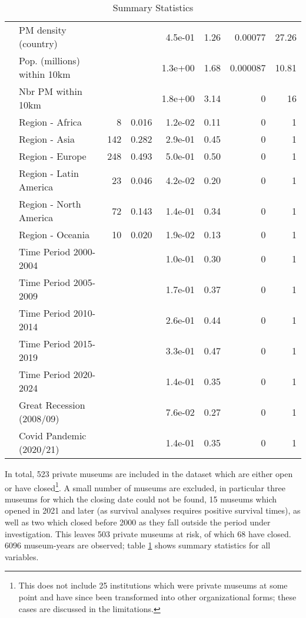 \documentclass[12pt]{article}
\begin{document}
\begin{table}[ht]
\begin{tabular}{llrrrrrr}
 & PM density (country) &  &  & 4.5e-01 &  1.26 & 0.00077 & 27.26 \\ 
   & Pop. (millions) within 10km &  &  & 1.3e+00 &  1.68 & 0.000087 & 10.81 \\ 
   & Nbr PM within 10km &  &  & 1.8e+00 &  3.14 & 0 & 16 \\ 
   & Region - Africa & 8 & 0.016 & 1.2e-02 &  0.11 & 0 & 1 \\ 
   & Region - Asia & 142 & 0.282 & 2.9e-01 &  0.45 & 0 & 1 \\ 
   & Region - Europe & 248 & 0.493 & 5.0e-01 &  0.50 & 0 & 1 \\ 
   & Region - Latin America & 23 & 0.046 & 4.2e-02 &  0.20 & 0 & 1 \\ 
   & Region - North America & 72 & 0.143 & 1.4e-01 &  0.34 & 0 & 1 \\ 
   & Region - Oceania & 10 & 0.020 & 1.9e-02 &  0.13 & 0 & 1 \\ 
   & Time Period 2000-2004 &  &  & 1.0e-01 &  0.30 & 0 & 1 \\ 
   & Time Period 2005-2009 &  &  & 1.7e-01 &  0.37 & 0 & 1 \\ 
   & Time Period 2010-2014 &  &  & 2.6e-01 &  0.44 & 0 & 1 \\ 
   & Time Period 2015-2019 &  &  & 3.3e-01 &  0.47 & 0 & 1 \\ 
   & Time Period 2020-2024 &  &  & 1.4e-01 &  0.35 & 0 & 1 \\ 
   & Great Recession (2008/09) &  &  & 7.6e-02 &  0.27 & 0 & 1 \\ 
   & Covid Pandemic (2020/21) &  &  & 1.4e-01 &  0.35 & 0 & 1 \\ 
   \hline
\end{tabular}
\caption{Summary Statistics} 
\label{tbl:t_sumstats}
\end{table}

In total, 523 private museums are included in the dataset which are either open or have closed\footnote{This does not include 25 institutions which were private museums at some point and have since been transformed into other organizational forms; these cases are discussed in the limitations.}.
A small number of museums are excluded, in particular three museums for which the closing date could not be found, 15 museums which opened in 2021 and later (as survival analyses requires positive survival times), as well as two which closed before 2000 as they fall outside the period under investigation.
This leaves 503 private museums at risk, of which 68 have closed.
6096 museum-years are observed; table \ref{tbl:t_sumstats} shows summary statistics for all variables.
\end{document}
